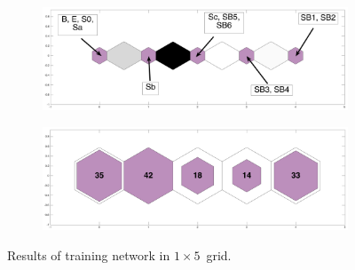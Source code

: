     \begin{figure}
        \begin{subfigure}[b]{0.5\textwidth}
            \centering
            \includegraphics[width=\textwidth]{../images0.01/1d/apps/dist_1_by_5.png}
        \end{subfigure}
        \hfill
        \begin{subfigure}[b]{0.5\textwidth}
             \includegraphics[width=\textwidth]{../images0.01/1d/apps/hit_v_1_by_5.png}
        \end{subfigure}
                \caption{Results of training network in $1\times5$~grid.}
         \label{fig: 1by5T}
    \end{figure}
    
